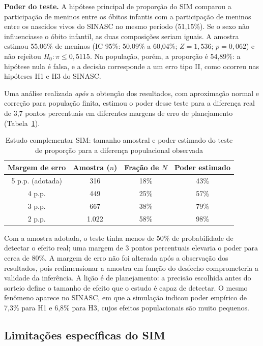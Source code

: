 \documentclass[12pt,a4paper]{article}
\begin{document}
\textbf{Poder do teste.} A hipótese principal de proporção do SIM comparou a participação de meninos entre os óbitos infantis com a participação de meninos entre os nascidos vivos do SINASC no mesmo período (51,15\%). Se o sexo não influenciasse o óbito infantil, as duas composições seriam iguais. A amostra estimou 55,06\% de meninos (IC 95\%: 50,09\% a 60,04\%; \(Z=1{,}536\); \(p=0{,}062\)) e não rejeitou \(H_0:\pi\le0{,}5115\). Na população, porém, a proporção é 54,89\%: a hipótese nula é falsa, e a decisão corresponde a um erro tipo II, como ocorreu nas hipóteses H1 e H3 do SINASC.

Uma análise realizada \emph{após} a obtenção dos resultados, com aproximação normal e correção para população finita, estimou o poder desse teste para a diferença real de 3,7 pontos percentuais em diferentes margens de erro de planejamento (Tabela~\ref{tab:poder_sim}).

\begin{table}[htbp]
\centering
\caption{Estudo complementar SIM: tamanho amostral e poder estimado do teste de proporção para a diferença populacional observada}
\label{tab:poder_sim}
\begin{tabular}{cccc}
\toprule
Margem de erro & Amostra (\(n\)) & Fração de \(N\) & Poder estimado\\
\midrule
5 p.p. (adotada) & 316 & 18\% & 43\%\\
4 p.p. & 449 & 25\% & 57\%\\
3 p.p. & 667 & 38\% & 79\%\\
2 p.p. & 1.022 & 58\% & 98\%\\
\bottomrule
\end{tabular}
\end{table}

Com a amostra adotada, o teste tinha menos de 50\% de probabilidade de detectar o efeito real; uma margem de 3 pontos percentuais elevaria o poder para cerca de 80\%. A margem de erro não foi alterada após a observação dos resultados, pois redimensionar a amostra em função do desfecho comprometeria a validade da inferência. A lição é de planejamento: a precisão escolhida antes do sorteio define o tamanho de efeito que o estudo é capaz de detectar. O mesmo fenômeno aparece no SINASC, em que a simulação indicou poder empírico de 7,3\% para H1 e 6,8\% para H3, cujos efeitos populacionais são muito pequenos.

\subsection{Limitações específicas do SIM}
\end{document}

